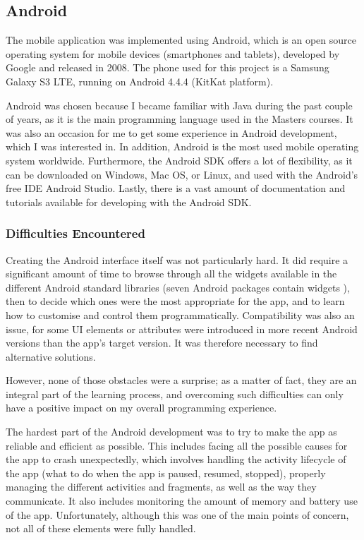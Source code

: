 \documentclass{mproj}
\begin{document}
\subsection{Android}

The mobile application was implemented using Android, which is an open source operating system for mobile devices (smartphones and tablets), developed by Google and released in 2008.\cite{androidrelease} The phone used for this project is a Samsung Galaxy S3 LTE, running on Android 4.4.4 (KitKat platform).

Android was chosen because I became familiar with Java during the past couple of years, as it is the main programming language used in the Masters courses. It was also an occasion for me to get some experience in Android development, which I was interested in. In addition, Android is the most used mobile operating system worldwide. \cite{androidsales} Furthermore, the Android SDK offers a lot of flexibility, as it can be downloaded on Windows, Mac OS, or Linux, and used with the Android's free IDE Android Studio. \cite{androidstudio} Lastly, there is a vast amount of documentation and tutorials available for developing with the Android SDK. \cite{androidtutorials} \cite{thebignerdranchguide}

\subsubsection*{Difficulties Encountered}

Creating the Android interface itself was not particularly hard. It did require a significant amount of time to browse through all the widgets available in the different Android standard libraries (seven Android packages contain widgets \cite{androidpackages}), then to decide which ones were the most appropriate for the app, and to learn how to customise and control them programmatically. Compatibility was also an issue, for some UI elements or attributes were introduced in more recent Android versions than the app's target version. It was therefore necessary to find alternative solutions. \par

However, none of those obstacles were a surprise; as a matter of fact, they are an integral part of the learning process, and overcoming such difficulties can only have a positive impact on my overall programming experience. \par

The hardest part of the Android development was to try to make the app as reliable and efficient as possible. This includes facing all the possible causes for the app to crash unexpectedly, which involves handling the activity lifecycle of the app \cite{androidlifecycle} (what to do when the app is paused, resumed, stopped), properly managing the different activities and fragments, as well as the way they communicate. It also includes monitoring the amount of memory and battery use of the app.
Unfortunately, although this was one of the main points of concern, not all of these elements were fully handled. \par
\end{document}

